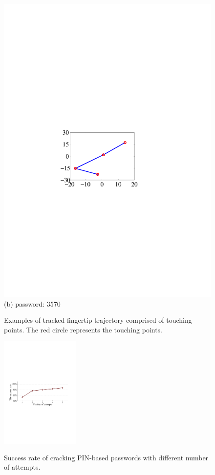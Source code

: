 \begin{figure}[!t]
{\begin{minipage}[t]{0.22\textwidth}
                \includegraphics[width=\textwidth]{fig/pin_3570.pdf}\\
                \centering \footnotesize (b) password: 3570
             \end{minipage}
        }
        \caption{Examples of tracked fingertip trajectory comprised of touching points. The red circle represents the touching points.}
        \label{fig:pins_trajectory}
    \end{figure}

    \begin{figure}[!t]
        \centering
        \includegraphics[width=0.35\textwidth]{fig/pin_results}\\
        \caption{Success rate of cracking PIN-based passwords with different number of attempts.}
        \label{fig:pin_results}
    \end{figure}
    
